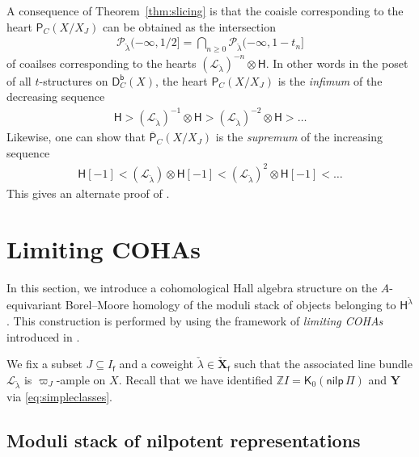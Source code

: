 \documentclass[reqno,a4paper]{amsart}
\newcommand{\calL}{\mathcal{L}}
\newcommand{\calP}{\mathcal{P}}
\newcommand{\Z}{\mathbb{Z}}
\newcommand{\sfH}{\mathsf{H}}
\newcommand{\sfK}{\mathsf{K}}
\newcommand{\sff}{\mathsf{f}}
\newcommand{\bfY}{\mathbf{Y}}
\newcommand{\bfX}{\mathbf{X}}
\newcommand{\catPC}{\mathsf{P}_{C}}
\newcommand{\barcatPC}{\overline{\mathsf{P}}_{C}}
\newcommand{\nilpPi}{\mathsf{nilp}\, \Pi}
\newcommand{\catDbC}{\mathsf{D}^\mathsf{b}_C}
\newcommand{\Llambda}{{\check{\lambda}}}
\newcommand{\rootlattice}{\bfY}
\newcommand{\weightlattice}{\bfX}
\newcommand{\coweightlattice}{\check{\weightlattice}}
\newcommand{\coweightlatticefin}{\coweightlattice_\sff}
\newcommand{\rsv}{X}
\newcommand{\psv}{X_J}
\theoremstyle{basic-theorem}
\numberwithin{equation}{section}
\begin{document}
\begin{remark}
    A consequence of Theorem~\ref{thm:slicing} is that the coaisle corresponding to the heart $\catPC(\rsv/\psv)$ can be obtained as the intersection
	\begin{align}
		\calP_\Llambda(-\infty, 1/2]=\bigcap_{n\geq 0}\calP_\Llambda(-\infty, 1-t_n]
	\end{align}
    of coailses corresponding to the hearts $(\calL_\Llambda)^{-n}\otimes \sfH$. In other words in the poset of all $t$-structures on $\catDbC(\rsv)$, the heart $\catPC(\rsv/\psv)$ is the \textit{infimum} of the decreasing sequence
	\begin{align}
		\sfH > (\calL_\Llambda)^{-1}\otimes \sfH>(\calL_\Llambda)^{-2}\otimes \sfH> \ldots
	\end{align}
    Likewise, one can show that $\barcatPC(\rsv/\psv)$ is the \textit{supremum} of the increasing sequence
	\begin{align}
		\sfH[-1]< (\calL_\Llambda)\otimes \sfH[-1] < (\calL_\Llambda)^2\otimes \sfH[-1] < \ldots
	\end{align}
    This gives an alternate proof of \cite[Theorem~6.3--(2)]{Shimpi_Torsion_pairs}.
\end{remark}


\section{Limiting COHAs}\label{sec:limitingCOHAs}

In this section, we introduce a cohomological Hall algebra structure on the $A$-equivariant Borel--Moore homology of the moduli stack of objects belonging to $\sfH^{\Llambda}$. This construction is performed by using the framework of \textit{limiting COHAs} introduced in \cite[Part~\ref*{COHA-Yangian-part:COHA-stability-condition}]{DPSSV-3}.

\medskip

We fix a subset $J\subseteq I_\sff$ and a coweight $\Llambda\in \coweightlatticefin$ such that the associated line bundle $\calL_{\Llambda}$ is $\varpi_J$-ample on $\rsv$. Recall that we have identified $\Z I=\sfK_0(\nilpPi)$ and $\rootlattice$ via \eqref{eq:simpleclasses}.

\subsection{Moduli stack of nilpotent representations}
\end{document}
